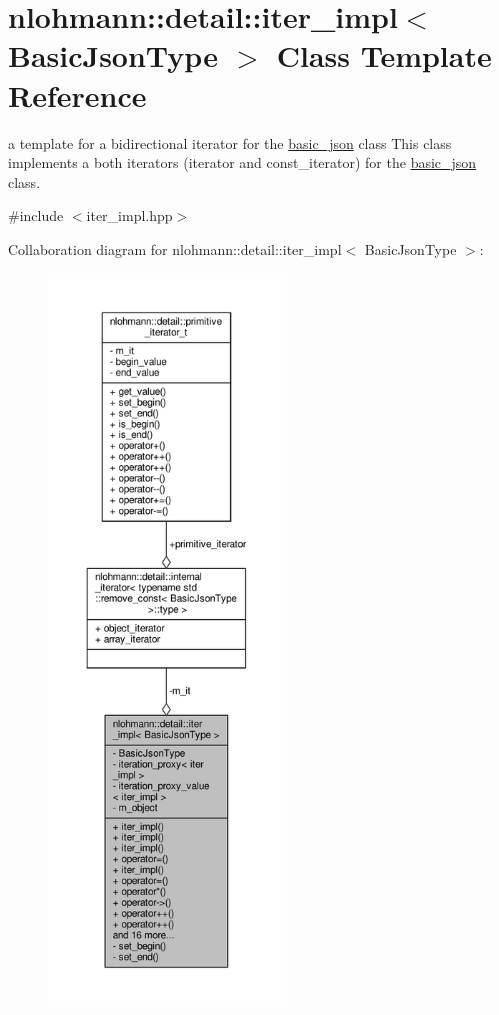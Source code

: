 \hypertarget{classnlohmann_1_1detail_1_1iter__impl}{}\section{nlohmann\+:\+:detail\+:\+:iter\+\_\+impl$<$ Basic\+Json\+Type $>$ Class Template Reference}
\label{classnlohmann_1_1detail_1_1iter__impl}


a template for a bidirectional iterator for the \hyperlink{classnlohmann_1_1basic__json}{basic\+\_\+json} class This class implements a both iterators (iterator and const\+\_\+iterator) for the \hyperlink{classnlohmann_1_1basic__json}{basic\+\_\+json} class.  




{\ttfamily \#include $<$iter\+\_\+impl.\+hpp$>$}



Collaboration diagram for nlohmann\+:\+:detail\+:\+:iter\+\_\+impl$<$ Basic\+Json\+Type $>$\+:\nopagebreak
\begin{figure}[H]
\begin{center}
\leavevmode
\includegraphics[height=550pt]{classnlohmann_1_1detail_1_1iter__impl__coll__graph}
\end{center}
\end{figure}
